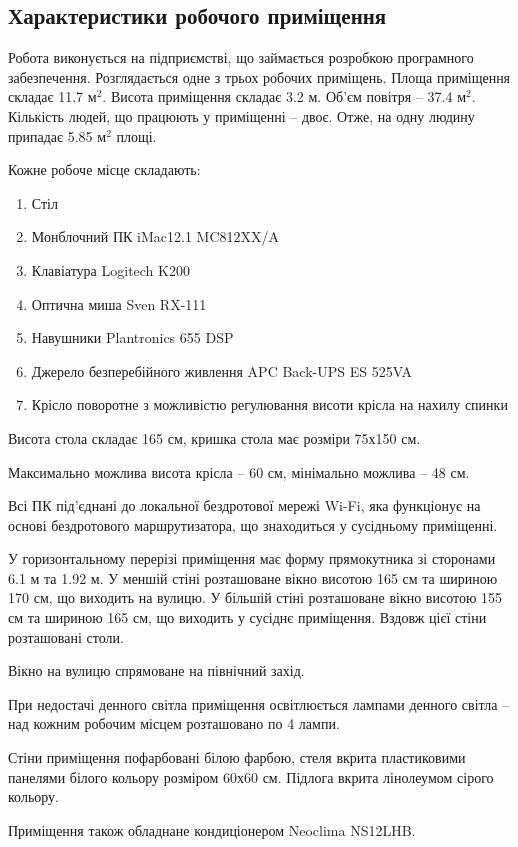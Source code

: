 \documentclass[a4paper,12pt]{article}
\begin{document}
\subsection{Характеристики робочого приміщення}
Робота виконується на підприємстві, що займається розробкою програмного забезпечення. Розглядається одне з трьох робочих приміщень. Площа приміщення складає 11.7 $\text{м}^2$. Висота приміщення складає 3.2 м. Об’єм повітря -- 37.4 $\text{м}^2$. Кількість людей, що працюють у приміщенні -- двоє. Отже, на одну людину припадає 5.85 $\text{м}^2$ площі.

Кожне робоче місце складають:
\begin{enumerate}
\item Стіл
\item Монблочний ПК iMac12.1 MC812XX/A
\item Клавіатура Logitech K200
\item Оптична миша Sven RX-111
\item Навушники Plantronics 655 DSP
\item Джерело безперебійного живлення APC Back-UPS ES 525VA
\item Крісло поворотне з можливістю регулювання висоти крісла на нахилу спинки
\end{enumerate}

Висота стола складає 165 см, кришка стола має розміри 75х150 см.

Максимально можлива висота крісла -- 60 см, мінімально можлива -- 48 см.

Всі ПК під’єднані до локальної бездротової мережі Wi-Fi, яка функціонує на основі бездротового маршрутизатора, що знаходиться у сусідньому приміщенні.

У горизонтальному перерізі приміщення має форму прямокутника зі сторонами 6.1 м та 1.92 м. У меншій стіні розташоване вікно висотою 165 см та шириною 170 см, що виходить на вулицю. У більшій стіні розташоване вікно  висотою 155 см та шириною 165 см, що виходить у сусіднє приміщення. Вздовж цієї стіни розташовані столи.

Вікно на вулицю спрямоване на північний захід.

При недостачі денного світла приміщення освітлюється лампами денного світла -- над кожним робочим місцем розташовано по 4 лампи.

Стіни приміщення пофарбовані білою фарбою, стеля вкрита пластиковими панелями білого кольору розміром 60х60 см. Підлога вкрита лінолеумом сірого кольору.

Приміщення також обладнане кондиціонером Neoclima NS12LHB.
\end{document}
